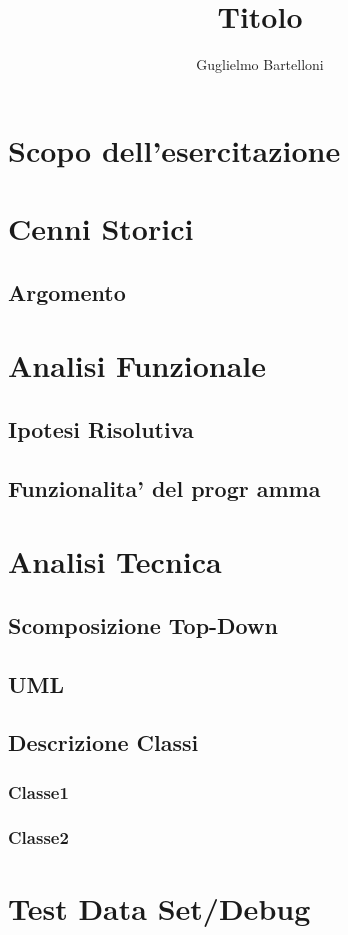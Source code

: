 \documentclass{article}
\author{Guglielmo Bartelloni}
\title{Titolo}
\begin{document}
\maketitle
\tableofcontents
\section{Scopo dell'esercitazione}
 
 
\section{Cenni Storici}
 
\subsection{Argomento}
 
 
\section{Analisi Funzionale}
 
\subsection{Ipotesi Risolutiva}
 
\subsection{Funzionalita' del progr
amma}
 
 
\section{Analisi Tecnica}
 
\subsection{Scomposizione Top-Down}
 
\subsection{UML}
 
\subsection{Descrizione Classi}
\subsubsection{Classe1}
\subsubsection{Classe2}
 
 
\section{Test Data Set/Debug}
\end{document}
